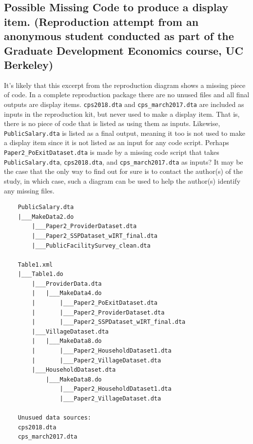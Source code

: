 \documentclass[]{book}
\begin{document}
\hypertarget{possible-missing-code-to-produce-a-display-item.-reproduction-attempt-from-an-anonymous-student-conducted-as-part-of-the-graduate-development-economics-course-uc-berkeley}{%
\subsection{Possible Missing Code to produce a display item. (Reproduction attempt from an anonymous student conducted as part of the Graduate Development Economics course, UC Berkeley)}\label{possible-missing-code-to-produce-a-display-item.-reproduction-attempt-from-an-anonymous-student-conducted-as-part-of-the-graduate-development-economics-course-uc-berkeley}}

It's likely that this excerpt from the reproduction diagram shows a missing piece of code. In a complete reproduction package there are no unused files and all final outputs are display items. \texttt{cps2018.dta} and \texttt{cps\_march2017.dta} are included as inputs in the reproduction kit, but never used to make a display item. That is, there is no piece of code that is listed as using them as inputs. Likewise, \texttt{PublicSalary.dta} is listed as a final output, meaning it too is not used to make a display item since it is not listed as an input for any code script. Perhaps \texttt{Paper2\_PoExitDataset.dta} is made by a missing code script that takes \texttt{PublicSalary.dta}, \texttt{cps2018.dta}, and \texttt{cps\_march2017.dta} as inputs? It may be the case that the only way to find out for sure is to contact the author(s) of the study, in which case, such a diagram can be used to help the author(s) identify any missing files.

\begin{verbatim}
    PublicSalary.dta
    |___MakeData2.do
        |___Paper2_ProviderDataset.dta
        |___Paper2_SSPDataset_wIRT_final.dta
        |___PublicFacilitySurvey_clean.dta
    
    Table1.xml
    |___Table1.do
        |___ProviderData.dta
        |   |___MakeData4.do
        |       |___Paper2_PoExitDataset.dta
        |       |___Paper2_ProviderDataset.dta
        |       |___Paper2_SSPDataset_wIRT_final.dta
        |___VillageDataset.dta
        |   |___MakeData8.do
        |       |___Paper2_HouseholdDataset1.dta
        |       |___Paper2_VillageDataset.dta
        |___HouseholdDataset.dta
            |___MakeData8.do
                |___Paper2_HouseholdDataset1.dta
                |___Paper2_VillageDataset.dta
    
    Unusued data sources:
    cps2018.dta
    cps_march2017.dta  
\end{verbatim}
\end{document}

